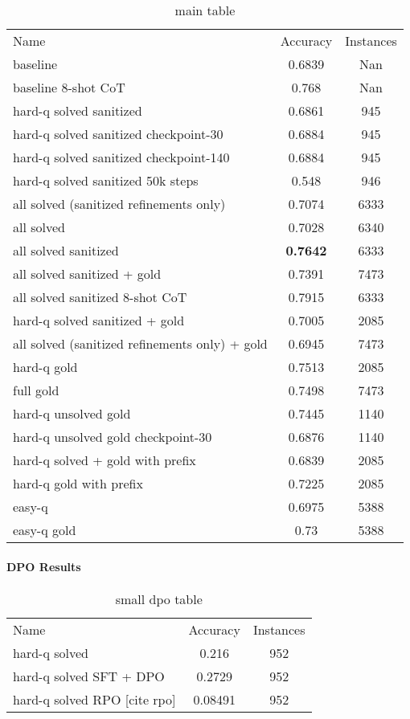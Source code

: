 \documentclass[a4paper,10pt]{article}
\begin{document}
\begin{table}[ht]
\centering
\begin{tabular}{lcc}

Name & Accuracy & Instances \\
baseline & 0.6839 & Nan\\
baseline 8-shot CoT & 0.768 & Nan \\
hard-q solved sanitized& 0.6861 & 945\\
hard-q solved sanitized checkpoint-30 & 0.6884 & 945\\
hard-q solved sanitized checkpoint-140 & 0.6884 & 945\\
hard-q solved sanitized 50k steps &  0.548  & 946 \\
all solved (sanitized refinements only)& 0.7074 & 6333\\
all solved & 0.7028 & 6340\\
all solved sanitized & \textbf{0.7642}  & 6333\\
all solved sanitized + gold & 0.7391 & 7473 \\
all solved sanitized 8-shot CoT & 0.7915 & 6333 \\ 
hard-q solved sanitized + gold & 0.7005  & 2085\\
all solved (sanitized refinements only) + gold & 0.6945 & 7473 \\
hard-q gold & 0.7513 & 2085 \\
full gold & 0.7498 & 7473 \\
hard-q unsolved gold & 0.7445 & 1140 \\
hard-q unsolved gold checkpoint-30 & 0.6876 & 1140 \\
hard-q solved + gold with prefix & 0.6839 & 2085 \\
hard-q gold with prefix & 0.7225 & 2085 \\
easy-q & 0.6975 & 5388 \\ 
easy-q gold & 0.73 & 5388 \\
\end{tabular}
\caption{main table}
\end{table}

\paragraph{DPO Results}

\begin{table}[ht]
\centering
 \begin{tabular}{lcc}
 Name & Accuracy & Instances \\
 hard-q solved & 0.216 & 952 \\
 hard-q solved SFT + DPO & 0.2729 & 952 \\
 hard-q solved RPO [cite rpo] & 0.08491 & 952 \\
 \end{tabular}
 \caption{small dpo table}
\end{table}
\end{document}
